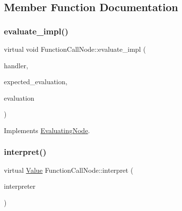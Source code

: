 \subsection{Member Function Documentation}
\mbox{\label{classFunctionCallNode_a65f15b75804343caf5c4ce291460b1dc}} 
\subsubsection{\texorpdfstring{evaluate\+\_\+impl()}{evaluate\_impl()}}
{\footnotesize\ttfamily virtual void Function\+Call\+Node\+::evaluate\+\_\+impl (\begin{DoxyParamCaption}\item[{\hyperlink{classSystemHandler}{System\+Handler} $\ast$}]{handler,  }\item[{\hyperlink{statics_8h_a6664c451ca7787483a7981cc1de68dbb}{E\+V\+A\+L\+U\+A\+T\+I\+O\+N\+\_\+\+T\+Y\+PE}}]{expected\+\_\+evaluation,  }\item[{struct \hyperlink{structEvaluation}{Evaluation} $\ast$}]{evaluation }\end{DoxyParamCaption})\hspace{0.3cm}{\ttfamily [virtual]}}



Implements \hyperlink{classEvaluatingNode_a085fa06e0b46a93c814dc55cda0c1b26}{Evaluating\+Node}.

\mbox{\label{classFunctionCallNode_a1d0d8806b7dd501ed43da58f77f7c49e}} 
\subsubsection{\texorpdfstring{interpret()}{interpret()}}
{\footnotesize\ttfamily virtual \hyperlink{classValue}{Value} Function\+Call\+Node\+::interpret (\begin{DoxyParamCaption}\item[{\hyperlink{classInterpreter}{Interpreter} $\ast$}]{interpreter }\end{DoxyParamCaption})\hspace{0.3cm}{\ttfamily [virtual]}}



